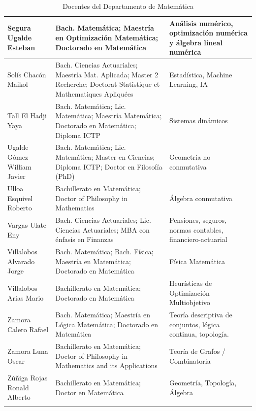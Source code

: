 \begin{landscape}
\begin{longtable}{|>{\raggedright\arraybackslash}p{5cm}|>{\raggedright\arraybackslash}p{9.8cm}|>{\raggedright\arraybackslash}p{5.6cm}|}
\hline
Segura Ugalde Esteban & Bach. Matemática; Maestría en Optimización Matemática; Doctorado en Matemática & Análisis numérico, optimización numérica y álgebra lineal numérica \\
\hline
Solís Chacón Maikol & Bach. Ciencias Actuariales; Maestría Mat. Aplicada; Master 2 Recherche; Doctorat Statistique et Mathematiques Apliquées & Estadística, Machine Learning, IA \\
\hline
Tall El Hadji Yaya & Bach. Matemática; Lic. Matemática; Maestría Matemática; Doctorado en Matemática; Diploma ICTP & Sistemas dinámicos \\
\hline
Ugalde Gómez William Javier & Bach. Matemática; Lic. Matemática; Master en Ciencias; Diploma ICTP; Doctor en Filosofía (PhD) & Geometría no conmutativa \\
\hline
Ulloa Esquivel Roberto & Bachillerato en Matemática; Doctor of Philosophy in Mathematics & Álgebra conmutativa \\
\hline
Vargas Ulate Eny & Bach. Ciencias Actuariales; Lic. Ciencias Actuariales; MBA con énfasis en Finanzas & Pensiones, seguros, normas contables, financiero-actuarial \\
\hline
Villalobos Alvarado Jorge & Bach. Matemática; Bach. Física; Maestría en Matemática; Doctorado en Matemática & Física Matemática \\
\hline
Villalobos Arias Mario & Bachillerato en Matemática; Doctorado en Matemática & Heurísticas de Optimización Multiobjetivo \\
\hline
Zamora Calero Rafael & Bach. Matemática; Maestría en Lógica Matemática; Doctorado en Matemática & Teoría descriptiva de conjuntos, lógica continua, topología. \\
\hline
Zamora Luna Oscar & Bachillerato en Matemática; Doctor of Philosophy in Mathematics and its Applications & Teoría de Grafos / Combinatoria \\
\hline
Zúñiga Rojas Ronald Alberto & Bachillerato en Matemática; Doctor en Matemática & Geometría, Topología, Álgebra \\
\hline
\caption{Docentes del Departamento de Matemática}
\label{tabla:docentes}

\end{longtable}
\end{landscape}
\endgroup

